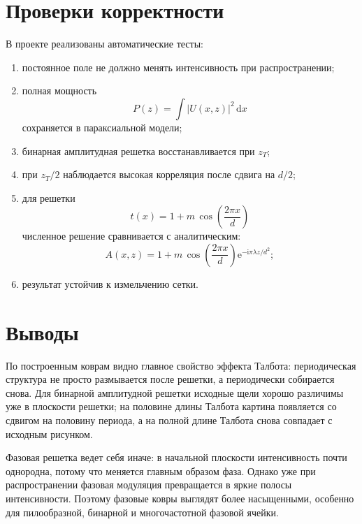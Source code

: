 \documentclass[12pt,a4paper]{article}
\newcommand{\dd}{\,\mathrm{d}}
\newcommand{\ii}{\mathrm{i}}
\newcommand{\e}{\mathrm{e}}
\begin{document}
\section{Проверки корректности}

В проекте реализованы автоматические тесты:
\begin{enumerate}
    \item постоянное поле не должно менять интенсивность при распространении;
    \item полная мощность
    \begin{equation}
        P(z)=\int |U(x,z)|^2\dd x
    \end{equation}
    сохраняется в параксиальной модели;
    \item бинарная амплитудная решетка восстанавливается при $z_T$;
    \item при $z_T/2$ наблюдается высокая корреляция после сдвига на $d/2$;
    \item для решетки
    \begin{equation}
        t(x)=1+m\,\cos\left(\frac{2\pi x}{d}\right)
    \end{equation}
    численное решение сравнивается с аналитическим:
    \begin{equation}
        A(x,z)=
        1+
        m\,\cos\left(\frac{2\pi x}{d}\right)
        \e^{-\ii\pi\lambda z/d^2};
    \end{equation}
    \item результат устойчив к измельчению сетки.
\end{enumerate}

\section{Выводы}

По построенным коврам видно главное свойство эффекта Талбота: периодическая структура не просто размывается после решетки, а периодически собирается снова. Для бинарной амплитудной решетки исходные щели хорошо различимы уже в плоскости решетки; на половине длины Талбота картина появляется со сдвигом на половину периода, а на полной длине Талбота снова совпадает с исходным рисунком.

Фазовая решетка ведет себя иначе: в начальной плоскости интенсивность почти однородна, потому что меняется главным образом фаза. Однако уже при распространении фазовая модуляция превращается в яркие полосы интенсивности. Поэтому фазовые ковры выглядят более насыщенными, особенно для пилообразной, бинарной и многочастотной фазовой ячейки.
\end{document}
